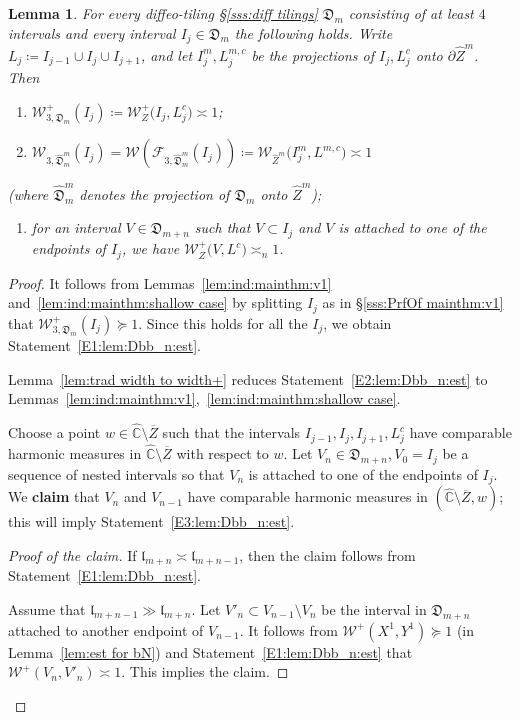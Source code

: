 \documentclass{amsart}
\newcommand{\1}{{\mathbb 1 }}
\newcommand{\Fam}{{\mathcal F}}
\newcommand{\Width}{{\mathcal W}}
\newcommand{\wZ}{{\widehat Z}}
\newcommand{\length}{{\mathfrak l}}
\newcommand{\wC}{\widehat{\mathbb{C}}}
\newcommand{\Dbb}{{\mathfrak{D}}}
\newtheorem{lem}[thm]{Lemma}
\theoremstyle{remark}
\numberwithin{equation}{section}
\theoremstyle{definition}
\begin{document}
\begin{lem}
\label{lem:Dbb_n:est}
 For every diffeo-tiling \S\ref{sss:diff tilings} $\Dbb_m$ consisting of at least $4$ intervals and every interval $I_j\in \Dbb_m$ the following holds. Write $L_j\coloneqq  I_{j-1} \cup I_j\cup I_{j+1}$, and let $ I^m_j,  L^{m,c}_j $ be the projections of $I_j, L_j^c$ onto $\partial \wZ^m$. Then
 \begin{enumerate}[label=\text{(\Roman*)},font=\normalfont,leftmargin=*]
 \item \label{E1:lem:Dbb_n:est} $\Width^+_{3,\Dbb_m}(I_j)\coloneqq \Width_Z^+\big(I_j, L_j^c\big)\asymp 1$;
 \item \label{E2:lem:Dbb_n:est} $\Width_{3,\widehat \Dbb^m_m}(I_j)=\Width\left(\Fam_{3,\widehat \Dbb^m_m}(I_j)\right)\coloneqq \Width_{\wZ^{m}}\big( I^m_j,  L^{m,c} \big)\asymp 1$
 \end{enumerate}
(where $\widehat \Dbb^m_m$ denotes the projection of $\Dbb_m$ onto $\wZ^m$);
 \begin{enumerate}[label=\text{(\Roman*)},start=3,font=\normalfont,leftmargin=*]
\item \label{E3:lem:Dbb_n:est}  for an interval $V\in \Dbb_{m+n}$ such that $V\subset I_j$ and $V$ is attached to one of the endpoints of $I_j$, we have $\Width_Z^+\big(V, L^c \big)\asymp_n 1$.
\end{enumerate}
\end{lem}
\begin{proof}
It follows from Lemmas~\ref{lem:ind:mainthm:v1} and~\ref{lem:ind:mainthm:shallow case} by splitting $I_j$ as in \S\ref{sss:PrfOf mainthm:v1} that $\Width^+_{3,\Dbb_m}(I_j)\succeq  1$. Since this holds for all the $I_j$, we obtain Statement~\ref{E1:lem:Dbb_n:est}.  

Lemma~\ref{lem:trad width to width+} reduces Statement~\ref{E2:lem:Dbb_n:est} to Lemmas~\ref{lem:ind:mainthm:v1},~\ref{lem:ind:mainthm:shallow case}. 

Choose a point $w\in \wC\setminus \overline Z$ such that the intervals $I_{j-1},I_j, I_{j+1}, L_j^c$ have comparable harmonic measures in $\wC\setminus \overline Z$ with respect to $w$. Let $V_{n}\in \Dbb_{m+n}, V_0=I_j$ be a sequence of nested intervals so that $V_{n}$ is attached to one of the endpoints of $I_j$. We {\bf claim} that $V_n$ and $V_{n-1}$ have comparable harmonic measures in $(\wC\setminus \overline Z, w)$; this will imply Statement~\ref{E3:lem:Dbb_n:est}.
\begin{proof}[Proof of the claim]
If $\length_{m+n}\asymp \length_{m+n-1}$, then the claim follows from Statement~\ref{E1:lem:Dbb_n:est}. 

Assume that $\length_{m+n-1}\gg \length_
{m+n}$. Let $V'_n\subset V_{n-1}\setminus V_n$ be the interval in $\Dbb_{m+n}$ attached to another endpoint of $V_{n-1}$. It follows from $\Width^+(X^1,Y^1)\succeq 1$ (in Lemma~\ref{lem:est for bN}) and Statement~\ref{E1:lem:Dbb_n:est} that $\Width^+(V_n,V'_n)\asymp 1$. This implies the claim.
\end{proof}
\end{proof}
\end{document}
